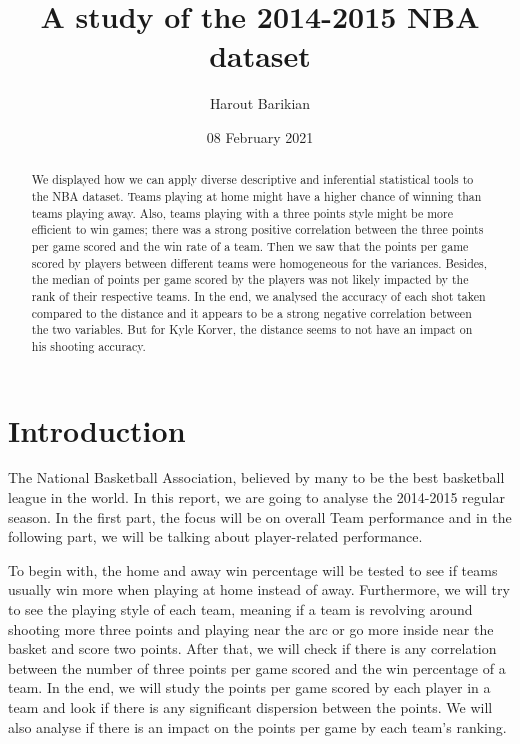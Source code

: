 \documentclass[
  12pt,
]{article}
\title{A study of the 2014-2015 NBA dataset}
\author{Harout Barikian}
\date{08 February 2021}
\begin{document}
\maketitle
\begin{abstract}
We displayed how we can apply diverse descriptive and inferential statistical tools to the NBA dataset. Teams playing at home might have a higher chance of winning than teams playing away. Also, teams playing with a three points style might be more efficient to win games; there was a strong positive correlation between the three points per game scored and the win rate of a team. Then we saw that the points per game scored by players between different teams were homogeneous for the variances. Besides, the median of points per game scored by the players was not likely impacted by the rank of their respective teams. In the end, we analysed the accuracy of each shot taken compared to the distance and it appears to be a strong negative correlation between the two variables. But for Kyle Korver, the distance seems to not have an impact on his shooting accuracy.
\end{abstract}

{
\setcounter{tocdepth}{2}
\tableofcontents
}
\newpage

\hypertarget{sec:intro}{%
\section{Introduction}\label{sec:intro}}

The National Basketball Association, believed by many to be the best basketball league in the world. In this report, we are going to analyse the 2014-2015 regular season. In the first part, the focus will be on overall Team performance and in the following part, we will be talking about player-related performance.

To begin with, the home and away win percentage will be tested to see if teams usually win more when playing at home instead of away. Furthermore, we will try to see the playing style of each team, meaning if a team is revolving around shooting more three points and playing near the arc or go more inside near the basket and score two points. After that, we will check if there is any correlation between the number of three points per game scored and the win percentage of a team. In the end, we will study the points per game scored by each player in a team and look if there is any significant dispersion between the points. We will also analyse if there is an impact on the points per game by each team's ranking.
\end{document}
